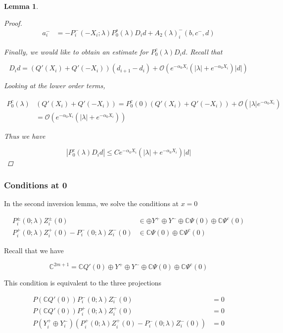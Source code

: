 \documentclass[12pt]{article}
\def\C{{\mathbb C}}
\newtheorem{lemma}{Lemma}
\begin{document}
\begin{lemma}
\begin{proof}
\begin{align*}
a_i^- &= -P_i^-(-X_i; \lambda) P_0^s(\lambda) D_i d + A_2(\lambda)_i^-(b, c^-, d)
\end{align*}

Finally, we would like to obtain an estimate for $P_0^c(\lambda) D_i d$. Recall that

\[
D_i d = ( Q'(X_i) + Q'(-X_i))(d_{i+1} - d_i ) + \mathcal{O} \left( e^{-\alpha_0 X_i} \left( |\lambda| +  e^{-\alpha_0 X_i}  \right) |d| \right) 
\]

Looking at the lower order terms,

\begin{align*}
P_0^c(\lambda)&( Q'(X_i) + Q'(-X_i)) 
= P_0^c(0)( Q'(X_i) + Q'(-X_i)) + \mathcal{O}(|\lambda|e^{-\alpha_0 X_i}) \\
&= \mathcal{O}(e^{-\alpha_0 X_i}(|\lambda| + e^{-\alpha_0 X_i}))
\end{align*}

Thus we have

\[
|P_0^c(\lambda) D_i d| \leq C e^{-\alpha_0 X_i}(|\lambda| + e^{-\alpha_0 X_i})|d|
\]

\end{proof}
\end{lemma}

\subsubsection{Conditions at 0}

In the second inversion lemma, we solve the conditions at $x = 0$

\begin{align*}
P_i^\pm(0; \lambda) Z_i^\pm(0) &\in \oplus Y^+ \oplus Y^- \oplus \C \Psi(0) \oplus \C \Psi^c(0) \\
P_i^+(0; \lambda) Z_i^+(0) - P_i^-(0; \lambda) Z_i^-(0) &\in \C \Psi(0) \oplus \C \Psi^c(0)
\end{align*}

Recall that we have

\begin{equation}\label{DSdecomp}
\C^{2m+1} = \C Q'(0) \oplus Y^+ \oplus Y^- \oplus \C \Psi(0) \oplus \C \Psi^c(0)
\end{equation}

This condition is equivalent to the three projections

\begin{align*}
P(\C Q'(0) ) P_i^-(0; \lambda) Z_i^-(0) &= 0 \\
P(\C Q'(0) ) P_i^+(0; \lambda) Z_i^+(0) &= 0 \\
P(Y_i^+ \oplus Y_i^-) ( P_i^+(0; \lambda) Z_i^+(0) - P_i^-(0; \lambda) Z_i^-(0) ) &= 0
\end{align*}
\end{document}
